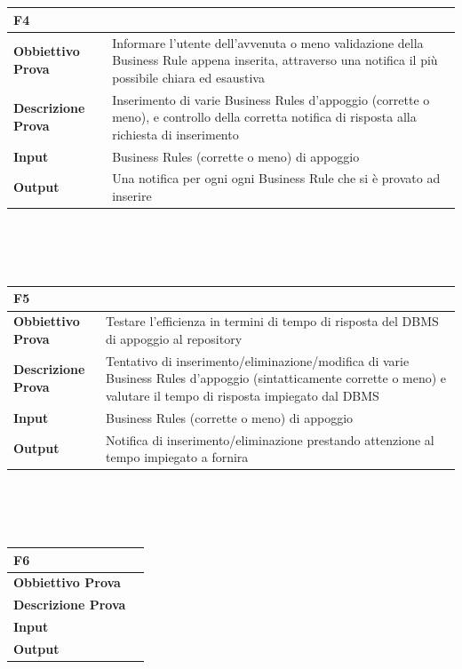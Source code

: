 \documentclass[11pt,titlepage,a4paper]{report}
\begin{document}
\\
\\
\begin{tabular}{||p{4.5cm}||p{7.5cm}||}
\hline
\textbf{\textsf{F4}} \\
\hline
{\textbf {Obbiettivo Prova}}& Informare l'utente dell'avvenuta o meno validazione della Business Rule appena inserita, attraverso una notifica il pi\`u possibile chiara ed esaustiva\\ \hline
{\textbf{Descrizione Prova}}& Inserimento di varie Business Rules d'appoggio (corrette o meno), e controllo della corretta notifica di risposta alla richiesta di inserimento \\ \hline
{\textbf{Input}}& Business Rules (corrette o meno) di appoggio  \\ \hline
{\textbf{Output}}& Una notifica per ogni ogni Business Rule che si \`e provato ad inserire \\ \hline
\end{tabular} \\
\\
\\
\begin{tabular}{||p{4.5cm}||p{7.5cm}||}
\hline
\textbf{\textsf{F5}} \\
\hline
{\textbf {Obbiettivo Prova}}& Testare l'efficienza in termini di tempo di risposta del DBMS di appoggio al repository\\ \hline
{\textbf{Descrizione Prova}}& Tentativo di inserimento/eliminazione/modifica di varie Business Rules d'appoggio (sintatticamente corrette o meno) e valutare il tempo di risposta impiegato dal DBMS \\ \hline
{\textbf{Input}}& Business Rules (corrette o meno) di appoggio  \\ \hline
{\textbf{Output}}& Notifica di inserimento/eliminazione prestando attenzione al tempo impiegato a fornira \\ \hline
\end{tabular} \\
\\
\\
\begin{tabular}{||p{4.5cm}||p{7.5cm}||}
\hline
\textbf{\textsf{F6}} \\
\hline
{\textbf {Obbiettivo Prova}}& \\ \hline
{\textbf{Descrizione Prova}}&  \\ \hline
{\textbf{Input}}&  \\ \hline
{\textbf{Output}}& \\ \hline
\end{tabular} \\
\end{document}
